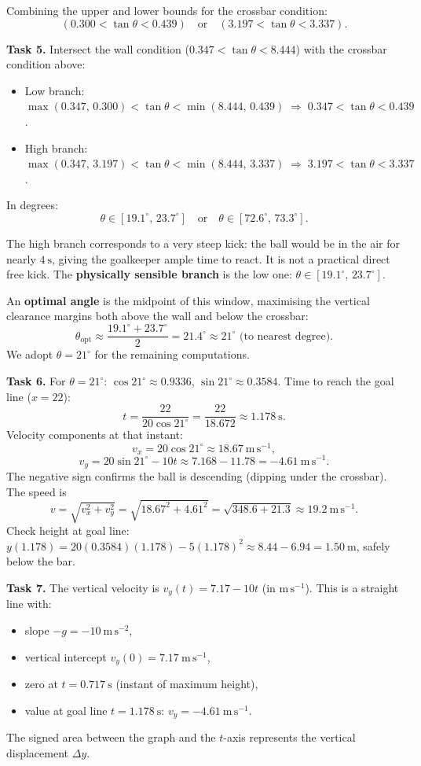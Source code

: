 \documentclass[11pt]{article}
\begin{document}
Combining the upper and lower bounds for the crossbar condition:
\[ (0.300 < \tan\theta < 0.439) \quad\text{or}\quad (3.197 < \tan\theta < 3.337). \]

\textbf{Task 5.} Intersect the wall condition ($0.347 < \tan\theta < 8.444$) with the crossbar condition above:
\begin{itemize}
\item Low branch: $\max(0.347,\,0.300) < \tan\theta < \min(8.444,\,0.439) \;\Rightarrow\; 0.347 < \tan\theta < 0.439$.
\item High branch: $\max(0.347,\,3.197) < \tan\theta < \min(8.444,\,3.337) \;\Rightarrow\; 3.197 < \tan\theta < 3.337$.
\end{itemize}
In degrees:
\[ \theta \in [19.1^{\circ},\, 23.7^{\circ}] \quad\text{or}\quad \theta \in [72.6^{\circ},\, 73.3^{\circ}]. \]

The high branch corresponds to a very steep kick: the ball would be in the air for nearly $4\ \mathrm{s}$, giving the goalkeeper ample time to react. It is not a practical direct free kick. The \textbf{physically sensible branch} is the low one: $\theta \in [19.1^{\circ},\, 23.7^{\circ}]$.

An \textbf{optimal angle} is the midpoint of this window, maximising the vertical clearance margins both above the wall and below the crossbar:
\[ \theta_{\text{opt}} \approx \frac{19.1^{\circ}+23.7^{\circ}}{2} = 21.4^{\circ} \approx 21^{\circ}\text{ (to nearest degree)}. \]
We adopt $\theta = 21^{\circ}$ for the remaining computations.

\textbf{Task 6.} For $\theta = 21^{\circ}$: $\cos21^{\circ} \approx 0.9336$, $\sin21^{\circ} \approx 0.3584$.
Time to reach the goal line ($x=22$):
\[ t = \frac{22}{20\cos21^{\circ}} = \frac{22}{18.672} \approx 1.178\ \mathrm{s}. \]
Velocity components at that instant:
\[ v_{x} = 20\cos21^{\circ} \approx 18.67\ \mathrm{m\,s^{-1}}, \]
\[ v_{y} = 20\sin21^{\circ} - 10t \approx 7.168 - 11.78 = -4.61\ \mathrm{m\,s^{-1}}. \]
The negative sign confirms the ball is descending (dipping under the crossbar). The speed is
\[ v = \sqrt{v_{x}^{2} + v_{y}^{2}} = \sqrt{18.67^{2} + 4.61^{2}} = \sqrt{348.6 + 21.3} \approx 19.2\ \mathrm{m\,s^{-1}}. \]
Check height at goal line: $y(1.178) = 20(0.3584)(1.178) - 5(1.178)^{2} \approx 8.44 - 6.94 = 1.50\ \mathrm{m}$, safely below the bar.

\textbf{Task 7.} The vertical velocity is $v_{y}(t) = 7.17 - 10t$ (in $\mathrm{m\,s^{-1}}$). This is a straight line with:
\begin{itemize}
\item slope $-g = -10\ \mathrm{m\,s^{-2}}$,
\item vertical intercept $v_{y}(0) = 7.17\ \mathrm{m\,s^{-1}}$,
\item zero at $t = 0.717\ \mathrm{s}$ (instant of maximum height),
\item value at goal line $t=1.178\ \mathrm{s}$: $v_{y} = -4.61\ \mathrm{m\,s^{-1}}$.
\end{itemize}
The signed area between the graph and the $t$-axis represents the vertical displacement $\Delta y$.
\end{document}
